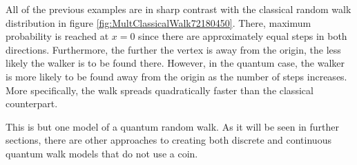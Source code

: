 \documentclass[../../dissertation.tex]{subfiles}
\begin{document}
All of the previous examples are in sharp contrast with the classical random
walk distribution in figure \ref{fig:MultClassicalWalk72180450}. There, maximum
probability is reached at $x=0$ since there are approximately equal steps in
both directions.  Furthermore, the further the vertex is away from the origin,
the less likely the walker is to be found there. However, in the quantum case,
the walker is more likely to be found away from the origin as the number of
steps increases.  More specifically, the walk spreads quadratically faster than
the classical counterpart.\par

This is but one model of a quantum random walk. As it will be seen in further
sections, there are other approaches to creating both discrete and continuous
quantum walk models that do not use a coin. 
\end{document}
